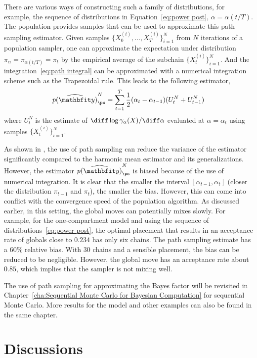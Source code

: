 There are various ways of constructing such a family of distributions, for
example, the sequence of distributions in Equation~\eqref{eq:power post},
$\alpha = \alpha(t/T)$. The population \mcmc provides samples that can be used
to approximate this path sampling estimator. Given samples
$\{X_0^{(i)},\dots,X_T^{(i)}\}_{i=1}^N$ from $N$ iterations of a population
\mcmc sampler, one can approximate the expectation under distribution
$\pi_{\alpha} = \pi_{\alpha(t/T)} = \pi_t$ by the empirical average of the
subchain $\{X_t^{(i)}\}_{i=1}^N$. And the integration~\eqref{eq:path integral}
can be approximated with a numerical integration scheme such as the
Trapezoidal rule. This leads to the following estimator,
\begin{equation}
  \widehat{p(\data)}_{\ps}^N = \sum_{t=1}^T
  \frac{1}{2}(\alpha_t - \alpha_{t-1})(U_t^N + U_{t-1}^N)
\end{equation}
where $U_t^N$ is the estimate of
$\diff\log\gamma_{\alpha}(X)/\diff\alpha$ evaluated at $\alpha = \alpha_t$
using samples $\{X_t^{(i)}\}_{i=1}^N$.

As shown in \cite{Calderhead:2009bd}, the use of path sampling can reduce the
variance of the estimator significantly compared to the harmonic mean
estimator and its generalizations. However, the estimator
$\widehat{p(\data)}_{\ps}^N$ is biased because of the use of numerical
integration. It is clear that the smaller the interval
$[\alpha_{t-1},\alpha_t]$ (closer the distribution $\pi_{t-1}$ and $\pi_t$),
the smaller the bias. However, this can come into conflict with the
convergence speed of the population \mcmc algorithm. As discussed earlier, in
this setting, the global moves can potentially mixes slowly. For example, for
the one-compartment \pet model and using the sequence of
distributions~\eqref{eq:power post}, the optimal placement that results in an
acceptance rate of globals close to $0.234$ has only six chains. The path
sampling estimate has a 60\% relative bias. With 30 chains and a sensible
placement, the bias can be reduced to be negligible. However, the global move
has an acceptance rate about $0.85$, which implies that the sampler is not
mixing well.

The use of path sampling for approximating the Bayes factor will be revisited
in Chapter~\ref{cha:Sequential Monte Carlo for Bayesian Computation} for
sequential Monte Carlo. More results for the \pet model and other examples can
also be found in the same chapter.

\section{Discussions}
\label{sec:Monte Carlo Discussion}

